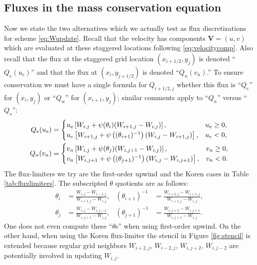 \documentclass[11pt,final]{amsart}
\newcommand\bV{\mathbf{V}}
\begin{document}
\subsection*{Fluxes in the mass conservation equation}  Now we state the two alternatives which we actually test as flux discretizations for scheme \eqref{eq:Wupdate}.  Recall that the velocity has components $\bV=(u,v)$ which are evaluated at these staggered locations following \eqref{eq:velocitycomp}.  Also recall that the flux at the staggered grid location $(x_{i+1/2},y_j)$ is denoted ``$Q_e(u_e)$'' and that the flux at $(x_i,y_{j+1/2})$ is denoted ``$Q_n(v_n)$.''  To ensure conservation we must have a single formula for $Q_{i+1/2,j}$ whether this flux is ``$Q_e$'' for $(x_i,y_j)$ or ``$Q_w$'' for $(x_{i+1},y_j)$; similar comments apply to ``$Q_n$'' versus ``$Q_s$'':
\begin{align}
Q_e(u_e) &= \begin{cases} u_e \left[W_{i,j} + \psi(\theta_{i}) (W_{i+1,j} - W_{i,j})\right], & u_e \ge 0, \\ u_e \left[W_{i+1,j} + \psi\left((\theta_{i+1})^{-1}\right) (W_{i,j} - W_{i+1,j})\right], & u_e < 0, \end{cases} \label{eq:adfluxes} \\
Q_n(v_n) &= \begin{cases} v_n \left[W_{i,j} + \psi(\theta_{j}) (W_{i,j+1} - W_{i,j})\right], & v_n \ge 0, \\ v_n \left[W_{i,j+1} + \psi\left((\theta_{j+1})^{-1}\right) (W_{i,j} - W_{i,j+1})\right], & v_n < 0. \end{cases} \notag
\end{align}
The flux-limiters we try are the first-order upwind and the Koren cases in Table \ref{tab:fluxlimiters}.  The subscripted $\theta$ quotients are as follows:
\begin{align*}
\theta_i &= \frac{W_{i,j}-W_{i-1,j}}{W_{i+1,j} - W_{i,j}}, & (\theta_{i+1})^{-1} &= \frac{W_{i+2,j}-W_{i+1,j}}{W_{i+1,j} - W_{i,j}}, \\
\theta_j &= \frac{W_{i,j}-W_{i,j-1}}{W_{i,j+1} - W_{i,j}}, & (\theta_{j+1})^{-1} &= \frac{W_{i,j+2}-W_{i,j+1}}{W_{i,j+1} - W_{i,j}}.
\end{align*}
One does not even compute these ``$\theta$s'' when using first-order upwind.  On the other hand, when using the Koren flux-limiter the stencil in Figure \ref{fig:stencil} is extended because regular grid neighbors $W_{i+2,j}$, $W_{i-2,j}$, $W_{i,j+2}$, $W_{i,j-2}$ are potentially involved in updating $W_{i,j}$.
\end{document}
